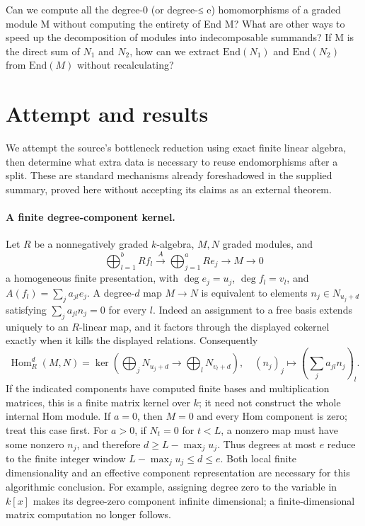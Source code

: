 \documentclass[11pt]{article}
\begin{document}
Can we compute all the degree-0 (or degree-≤ e) homomorphisms of a graded module M without computing the entirety of End M? What are other ways to speed up the decomposition of modules into indecomposable summands? If M is the direct sum of $N_1$ and $N_2$, how can we extract $\mathrm{End}(N_1)$ and $\mathrm{End}(N_2)$ from $\mathrm{End}(M)$ without recalculating?

\section{Attempt and results}
We attempt the source's bottleneck reduction using exact finite linear algebra,
then determine what extra data is necessary to reuse endomorphisms after a
split. These are standard mechanisms already foreshadowed in the supplied
summary, proved here without accepting its claims as an external theorem.

\paragraph{A finite degree-component kernel.}
Let $R$ be a nonnegatively graded $k$-algebra, $M,N$ graded modules, and
\[
\bigoplus_{l=1}^b R f_l\xrightarrow{A}
\bigoplus_{j=1}^a R e_j\longrightarrow M\longrightarrow0
\]
a homogeneous finite presentation, with $\deg e_j=u_j$, $\deg f_l=v_l$,
and $A(f_l)=\sum_j a_{jl}e_j$. A degree-$d$ map $M\to N$ is equivalent
to elements $n_j\in N_{u_j+d}$ satisfying
$\sum_j a_{jl}n_j=0$ for every $l$. Indeed an assignment to a free basis
extends uniquely to an $R$-linear map, and it factors through the displayed
cokernel exactly when it kills the displayed relations. Consequently
\[
\operatorname{Hom}_R^d(M,N)=\ker\left(
\bigoplus_j N_{u_j+d}\longrightarrow\bigoplus_l N_{v_l+d}\right),
\quad(n_j)_j\longmapsto(\sum_j a_{jl}n_j)_l.
\]
If the indicated components have computed finite bases and multiplication
matrices, this is a finite matrix kernel over $k$; it need not construct the
whole internal Hom module. If $a=0$, then $M=0$ and every Hom component is zero; treat this case first.
For $a>0$, if $N_t=0$ for $t<L$, a nonzero map must have some
nonzero $n_j$, and therefore $d\ge L-\max_j u_j$. Thus degrees at most $e$
reduce to the finite integer window $L-\max_j u_j\le d\le e$.
Both local finite dimensionality and an effective component representation
are necessary for this algorithmic conclusion. For example, assigning degree
zero to the variable in $k[x]$ makes its degree-zero component infinite
 dimensional; a finite-dimensional matrix computation no longer follows.
\end{document}
